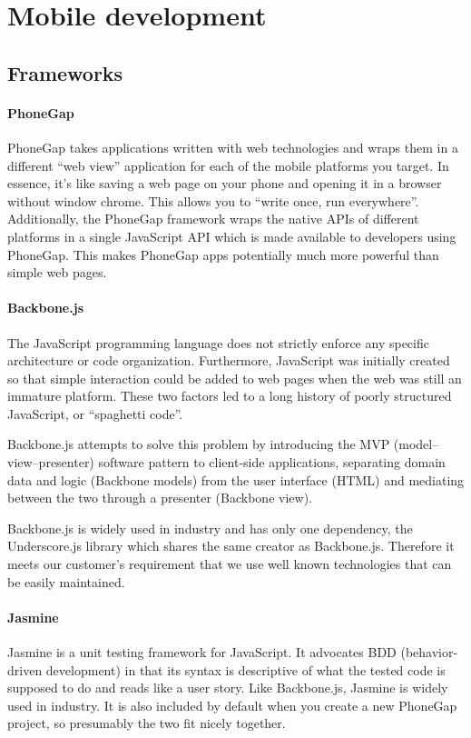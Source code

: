 \section{Mobile development}

\subsection{Frameworks}

\paragraph{PhoneGap}
PhoneGap takes applications written with web technologies and wraps them in
a different ``web view'' application for each of the mobile platforms you
target. In essence, it's like saving a web page on your phone and opening
it in a browser without window chrome. This allows you to ``write once, run
everywhere''. Additionally, the PhoneGap framework wraps the native APIs of
different platforms in a single JavaScript API which is made available to
developers using PhoneGap. This makes PhoneGap apps potentially much more
powerful than simple web pages.

\paragraph{Backbone.js}
The JavaScript programming language does not strictly enforce any specific
architecture or code organization. Furthermore, JavaScript was initially
created so that simple interaction could be added to web pages when the web was
still an immature platform. These two factors led to a long history of poorly
structured JavaScript, or ``spaghetti code''.

Backbone.js attempts to solve this problem by introducing the MVP
(model--view--presenter) software pattern to client-side applications,
separating domain data and logic (Backbone models) from the user interface
(HTML) and mediating between the two through a presenter (Backbone view).

Backbone.js is widely used in industry and has only one dependency, the
Underscore.js library which shares the same creator as Backbone.js.
Therefore it meets our customer's requirement that we use well known
technologies that can be easily maintained.

\paragraph{Jasmine}
Jasmine is a unit testing framework for JavaScript. It advocates BDD
(behavior-driven development) in that its syntax is descriptive of what the
tested code is supposed to do and reads like a user story. Like Backbone.js,
Jasmine is widely used in industry. It is also included by default when you
create a new PhoneGap project, so presumably the two fit nicely together.

